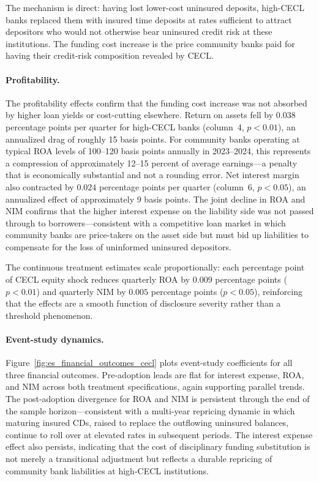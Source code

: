 The mechanism is direct: having lost lower-cost uninsured deposits, high-CECL
banks replaced them with insured time deposits at rates sufficient to attract
depositors who would not otherwise bear uninsured credit risk at these
institutions.  The funding cost increase is the price community banks paid for
having their credit-risk composition revealed by CECL.

\paragraph{Profitability.}
The profitability effects confirm that the funding cost increase was not absorbed
by higher loan yields or cost-cutting elsewhere.  Return on assets fell by $0.038$
percentage points per quarter for high-CECL banks (column~4, $p < 0.01$), an
annualized drag of roughly 15 basis points.  For community banks operating at
typical ROA levels of 100--120 basis points annually in 2023--2024, this
represents a compression of approximately 12--15 percent of average earnings---a
penalty that is economically substantial and not a rounding error.  Net interest
margin also contracted by $0.024$ percentage points per quarter (column~6,
$p < 0.05$), an annualized effect of approximately 9 basis points.  The joint
decline in ROA and NIM confirms that the higher interest expense on the liability
side was not passed through to borrowers---consistent with a competitive loan
market in which community banks are price-takers on the asset side but must bid
up liabilities to compensate for the loss of uninformed uninsured depositors.

The continuous treatment estimates scale proportionally: each percentage point of
CECL equity shock reduces quarterly ROA by $0.009$ percentage points ($p < 0.01$)
and quarterly NIM by $0.005$ percentage points ($p < 0.05$), reinforcing that the
effects are a smooth function of disclosure severity rather than a threshold
phenomenon.

\paragraph{Event-study dynamics.}
Figure~\ref{fig:es_financial_outcomes_cecl} plots event-study coefficients for
all three financial outcomes.  Pre-adoption leads are flat for interest expense,
ROA, and NIM across both treatment specifications, again supporting parallel
trends.  The post-adoption divergence for ROA and NIM is persistent through the
end of the sample horizon---consistent with a multi-year repricing dynamic in
which maturing insured CDs, raised to replace the outflowing uninsured balances,
continue to roll over at elevated rates in subsequent periods.  The interest
expense effect also persists, indicating that the cost of disciplinary funding
substitution is not merely a transitional adjustment but reflects a durable
repricing of community bank liabilities at high-CECL institutions.


